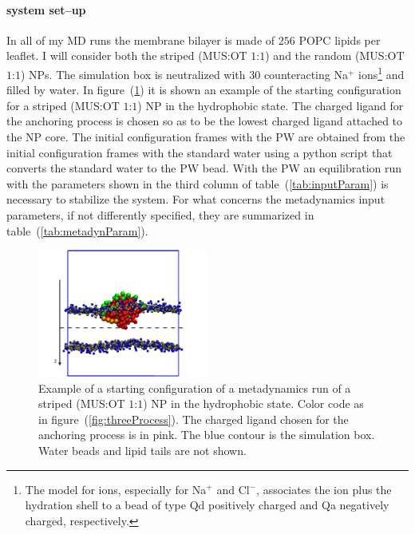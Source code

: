 \paragraph{\textbf{system set--up}} In all of my \ac{MD} runs the membrane bilayer is made of $256$ \ac{POPC} lipids per leaflet. I will consider both the striped (\ac{MUS}:\ac{OT} $1$:$1$) and the random (\ac{MUS}:\ac{OT} $1$:$1$) \acp{NP}. The simulation box is neutralized with $30$ counteracting Na$^+$ ions\footnote{The \martini model for ions, especially for Na$^+$ and Cl$^-$, associates the ion plus the hydration shell to a bead of type Qd positively charged and Qa negatively charged, respectively.} and filled by water. In figure~(\ref{fig:startFrameEx}) it is shown an example of the starting configuration for a striped (\ac{MUS}:\ac{OT} $1$:$1$) \ac{NP} in the hydrophobic state. The charged ligand for the anchoring process is chosen so as to be the lowest charged ligand attached to the \ac{NP} core. The initial configuration frames with the \ac{PW} are obtained from the initial configuration frames with the standard \martini water using a python script that converts the standard \martini water to the \ac{PW} bead. With the \ac{PW} an equilibration run with the parameters shown in the third column of table~(\ref{tab:inputParam}) is necessary to stabilize the system. For what concerns the metadynamics input parameters, if not differently specified, they are summarized in table~(\ref{tab:metadynParam}).
\begin{figure}
	\centering
	\includegraphics[width=0.5\textwidth]{./img/patchedHydrophobic}
	\caption{Example of a starting configuration of a metadynamics run of a striped (\ac{MUS}:\ac{OT} $1$:$1$) \ac{NP} in the hydrophobic state. Color code as in figure~(\ref{fig:threeProcess}). The charged ligand chosen for the anchoring process is in pink. The blue contour is the simulation box. Water beads and lipid tails are not shown.}
	\label{fig:startFrameEx}
\end{figure}

